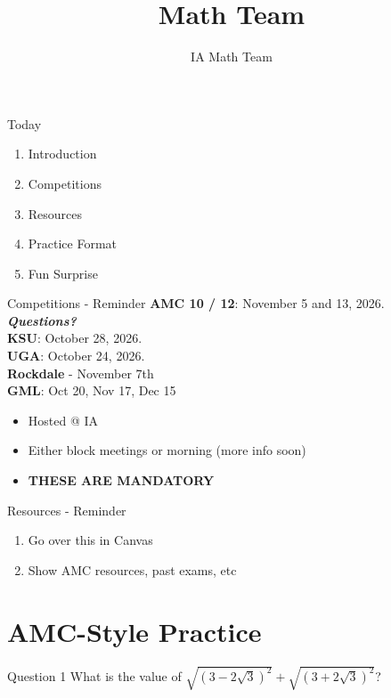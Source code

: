 \documentclass[aspectratio=169,xcolor=dvipsnames]{beamer}
\title[Math Team]{Math Team}
\author[IA Math Team]{IA Math Team}
\begin{document}
\begin{frame}[t]
  \titlepage
\end{frame}


\begin{frame}[t]{Today}
\vspace{0.35cm}
\begin{enumerate}
    \item Introduction
    \item Competitions
    \item Resources
    \item Practice Format
    \item Fun Surprise
\end{enumerate}
\end{frame}

\begin{frame}[t]{Competitions - Reminder}
\vspace{0.35cm}
\textbf{AMC 10 / 12}: November 5 and 13, 2026. \textbf{\textit{Questions?}} \\
\textbf{KSU}: October 28, 2026. \\
\textbf{UGA}: October 24, 2026. \\
\textbf{Rockdale} - November 7th \\
\textbf{GML}: Oct 20, Nov 17, Dec 15\\
\begin{itemize}
    \small \item Hosted @ IA
    \item Either block meetings or morning (more info soon)
    \item \textbf{THESE ARE MANDATORY}
\end{itemize}
\end{frame}

\begin{frame}[t]{Resources - Reminder}
\begin{enumerate}
    \item Go over this in Canvas
    \item Show AMC resources, past exams, etc
\end{enumerate}
\end{frame}

\section{AMC-Style Practice}

\begin{frame}[t]{Question 1}
    What is the value of $\sqrt{\left(3-2\sqrt{3}\right)^2}+\sqrt{\left(3+2\sqrt{3}\right)^2}$?
\end{frame}
\end{document}
